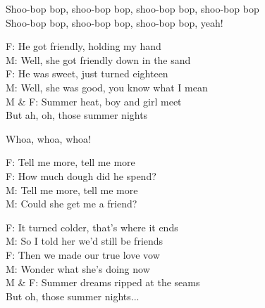 Shoo-bop bop, shoo-bop bop, shoo-bop bop, shoo-bop bop\\
Shoo-bop bop, shoo-bop bop, shoo-bop bop, yeah!

F: He got friendly, holding my hand\\
M: Well, she got friendly down in the sand\\
F: He was sweet, just turned eighteen\\
M: Well, she was good, you know what I mean\\
M \& F: Summer heat, boy and girl meet\\
But ah, oh, those summer nights

Whoa, whoa, whoa!

F: Tell me more, tell me more\\
F: How much dough did he spend?\\
M: Tell me more, tell me more\\
M: Could she get me a friend?

F: It turned colder, that's where it ends\\
M: So I told her we'd still be friends\\
F: Then we made our true love vow\\
M: Wonder what she's doing now\\
M \& F: Summer dreams ripped at the seams\\
But oh, those summer nights...
